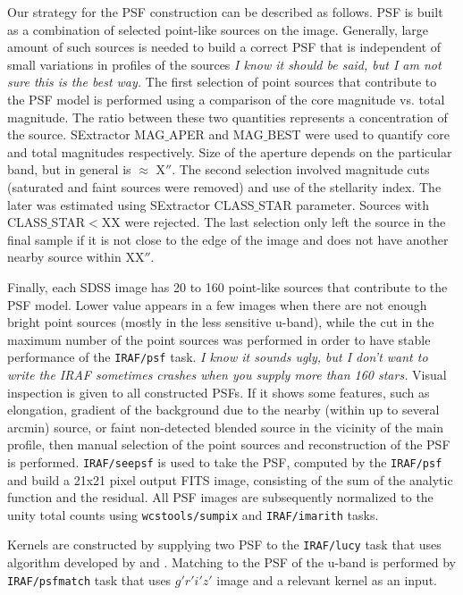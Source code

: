 \documentclass[apj,iop]{emulateapj}
\begin{document}
Our strategy for the PSF construction can be described as follows. PSF is built as a combination of selected point-like sources on the image. Generally, large amount of such sources is needed to build a correct PSF that is independent of small variations in profiles of the sources \textit{I know it should be said, but I am not sure this is the best way.} The first selection of point sources that contribute to the PSF model is performed using a comparison of the core magnitude vs. total magnitude. The ratio between these two quantities represents a concentration of the source. SExtractor MAG$\_$APER and MAG$\_$BEST were used to quantify core and total magnitudes respectively. Size of the aperture depends on the particular band, but in general is $\approx$ X$''$. The second selection involved magnitude cuts (saturated and faint sources were removed) and use of the stellarity index. The later was estimated using SExtractor CLASS$\_$STAR parameter. Sources with CLASS$\_$STAR$<$XX were rejected. The last selection only left the source in the final sample if it is not close to the edge of the image and does not have another nearby source within XX$''$. 

Finally, each SDSS image has 20 to 160 point-like sources that contribute to the PSF model. Lower value appears in a few images when there are not enough bright point sources (mostly in the less sensitive u-band), while the cut in the maximum number of the point sources was performed in order to have stable performance of the {\tt IRAF/psf} task. \textit{I know it sounds ugly, but I don't want to write the IRAF sometimes  crashes when you supply more than 160 stars.} Visual inspection is given to all constructed PSFs. If it shows some features, such as elongation, gradient of the background due to the nearby (within up to several arcmin) source, or faint non-detected blended source in the vicinity of the main profile, then manual selection of the point sources and reconstruction of the PSF is performed. {\tt IRAF/seepsf} is used to take the PSF, computed by the {\tt IRAF/psf} and build a 21x21 pixel output FITS image, consisting of the sum of the analytic function and the residual. All PSF images are subsequently normalized to the unity total counts using {\tt wcstools/sumpix} \citep{Mink1998b} and {\tt IRAF/imarith} tasks. 

Kernels are constructed by supplying two PSF to the {\tt IRAF/lucy} task that uses algorithm developed by \citet{Richardson1972} and \citet{Lucy1974}. Matching to the PSF of the u-band is performed by {\tt IRAF/psfmatch} task that uses $g'r'i'z'$ image and a relevant kernel as an input.
\end{document}

